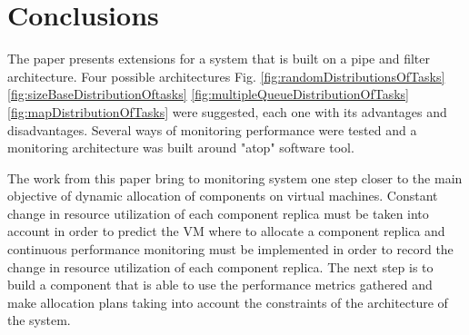 \section*{Conclusions}
The paper presents extensions for a system that is built on a pipe and filter architecture. Four possible architectures Fig. \ref{fig:randomDistributionsOfTasks} \ref{fig:sizeBaseDistributionOftasks} \ref{fig:multipleQueueDistributionOfTasks} \ref{fig:mapDistributionOfTasks} were suggested, each one with its advantages and disadvantages. Several ways of monitoring performance were tested and a monitoring architecture was built around "atop" software tool. 

The work from this paper bring to monitoring system one step closer to the main objective of dynamic allocation of components on virtual machines. Constant change in resource utilization of each component replica must be taken into account in order to predict the VM where to allocate a component replica and continuous performance monitoring must be implemented in order to record the change in resource utilization of each component replica. The next step is to build a component that is able to use the performance metrics gathered and make allocation plans taking into account the constraints of the architecture of the system.